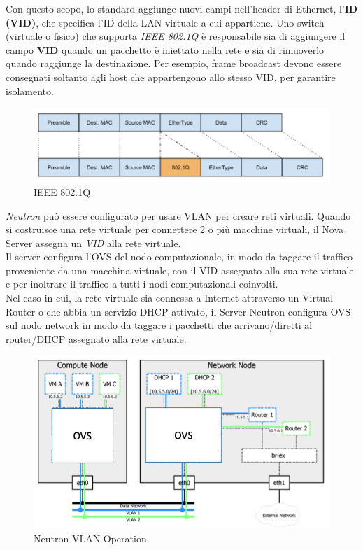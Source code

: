 \documentclass{article}
\begin{document}
Con questo scopo, lo standard aggiunge nuovi campi nell'header di Ethernet, l'\textbf{ID (VID)}, che specifica l'ID della LAN virtuale a cui appartiene. Uno switch (virtuale o fisico) che supporta \textit{IEEE 802.1Q} è responsabile sia di aggiungere il campo \textbf{VID} quando un pacchetto è iniettato nella rete e sia di rimuoverlo quando raggiunge la destinazione. Per esempio, frame broadcast devono essere consegnati soltanto agli host che appartengono allo stesso VID, per garantire isolamento.
\begin{figure}[H]
    \centering
    \includegraphics[scale=0.4]{img/802.1Q.png}
    \caption{IEEE 802.1Q}
\end{figure}\noindent
\textit{Neutron} può essere configurato per usare VLAN per creare reti virtuali. Quando si costruisce una rete virtuale per connettere 2 o più macchine virtuali, il Nova Server assegna un \textit{VID} alla rete virtuale. \\
Il server configura l'OVS del nodo computazionale, in modo da taggare il traffico proveniente da una macchina virtuale, con il VID assegnato alla sua rete virtuale e per inoltrare il traffico a tutti i nodi computazionali coinvolti. \\
Nel caso in cui, la rete virtuale sia connessa a Internet attraverso un Virtual Router o che abbia un servizio DHCP attivato, il Server Neutron configura OVS sul nodo network in modo da taggare i pacchetti che arrivano/diretti al router/DHCP assegnato alla rete virtuale.
\begin{figure}[H]
    \centering
    \includegraphics[scale=0.4]{img/Neutron VLAN.png}
    \caption{Neutron VLAN Operation}
\end{figure}\noindent
\end{document}
